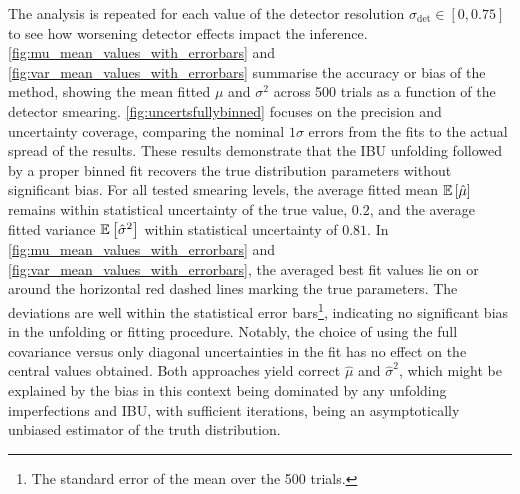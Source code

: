             The analysis is repeated for each value of the detector resolution $\sigma_{\text{det}}\in[0, 0.75]$ to see how worsening detector effects impact the inference.
            \cref{fig:mu_mean_values_with_errorbars} and \cref{fig:var_mean_values_with_errorbars} summarise the accuracy or bias of the method, showing the mean fitted $\mu$ and $\sigma^2$ across 500 trials as a function of the detector smearing.
            \cref{fig:uncertsfullybinned} focuses on the precision and uncertainty coverage, comparing the nominal $1\sigma$ errors from the fits to the actual spread of the results.
            These results demonstrate that the IBU unfolding followed by a proper binned fit recovers the true distribution parameters without significant bias.
            For all tested smearing levels, the average fitted mean $\operatorname{\mathbb{E}}\qty[\hat{\mu}]$ remains within statistical uncertainty of the true value, \(0.2\), and the average fitted variance $\operatorname{\mathbb{E}}\qty[\hat{\sigma}^2]$ within statistical uncertainty of \(0.81\).
            In \cref{fig:mu_mean_values_with_errorbars} and \cref{fig:var_mean_values_with_errorbars}, the averaged best fit values lie on or around the horizontal red dashed lines marking the true parameters.
            The deviations are well within the statistical error bars\footnote{The standard error of the mean over the 500 trials.}, indicating no significant bias in the unfolding or fitting procedure.
            Notably, the choice of using the full covariance versus only diagonal uncertainties in the fit has no effect on the central values obtained.
            Both approaches yield correct $\hat{\mu}$ and $\hat{\sigma}^2$, which might be explained by the bias in this context being dominated by any unfolding imperfections and IBU, with sufficient iterations, being an asymptotically unbiased estimator of the truth distribution.
    
